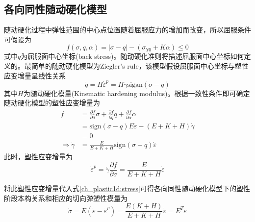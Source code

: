 \subsection{各向同性随动硬化模型}
随动硬化过程中弹性范围的中心点位置随着屈服应力的增加而改变，所以屈服条件可假设为
\begin{equation}
f(\sigma,q,\alpha) = \vert \sigma - q \vert - (\sigma_{Y0} + K \alpha) \le 0
\end{equation}
式中$q$为屈服面中心坐标(back stress)。随动硬化准则将描述屈服面中心坐标如何定义的。最简单的随动硬化模型为Ziegler's rule，该模型假设屈服面中心坐标与塑性应变增量呈线性关系
\begin{equation}
    \dot q = H \dot \varepsilon^p = H \dot \gamma \mathrm{sigan}(\sigma-q)
\end{equation}
其中$H$为随动硬化模量(Kinematic hardening modulus)。根据一致性条件即可确定随动硬化模型的塑性应变增量为
\begin{equation}
    \begin{split}
        \dot f &= \frac{\partial f}{\partial \sigma} \dot \sigma + \frac{\partial f}{\partial q} \dot q + \frac{\partial f}{\partial \alpha} \dot \alpha \\
               &= \mathrm{sign}(\sigma-q) E\dot \varepsilon - (E+K+H) \dot \gamma \\
               &= 0 \\
        \Rightarrow \dot \gamma &= \frac{E}{E+K+H} \mathrm{sign}(\sigma-q) \dot \varepsilon
    \end{split}
\end{equation}
此时，塑性应变增量为
\begin{equation}
\dot \varepsilon^p = \dot \gamma \frac{\partial f}{\partial \sigma} = \frac{E}{E+K+H} \dot \varepsilon
\end{equation}\par
将此塑性应变增量代入式\eqref{ch_plastic1d:stress}可得各向同性随动硬化模型下的塑性阶段本构关系和相应的切向弹塑性模量为
\begin{equation}
\dot \sigma = E(\dot \varepsilon - \dot \varepsilon^p) = \frac{E(K+H)}{E+K+H} \dot \varepsilon = E^T \dot \varepsilon
\end{equation}

